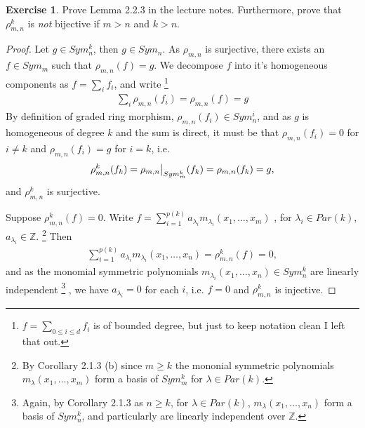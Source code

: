 \documentclass[12pt]{extarticle}
\newcommand{\Z}{\mathbb{Z}}
\newcommand{\<}{\langle}
\renewcommand{\>}{\rangle}
\theoremstyle{definition}
\newtheorem{exercise}{Exercise}
\newcommand\restr[2]{{%
  \left.\kern-\nulldelimiterspace %
  #1 %
  \vphantom{\big|} %
  \right|_{#2} %
  }}
\begin{document}
\begin{exercise}
  Prove Lemma 2.2.3 in the lecture notes. Furthermore, prove that $\rho_{m,n}^k$ is \emph{not} bijective if $m>n$ and $k>n$.
\end{exercise}
\begin{proof}
  Let $g \in Sym_n^k$, then $g \in Sym_n$. As $\rho_{m,n}$ is surjective, there exists an $f \in Sym_m$ such that $\rho_{m,n}(f) = g$. We decompose $f$ into it's homogeneous components as $f = \sum\limits_{i} f_i$, and write
  \footnote{$f = \sum\limits_{0 \leq i \leq d} f_i$ is of bounded degree, but just to keep notation clean I left that out.}
  \begin{align*}
    \sum\limits_i \rho_{m,n}(f_i) =  \rho_{m,n}(f) = g
  \end{align*}
  By definition of graded ring morphism, $\rho_{m,n}(f_i) \in Sym_n^i$, and as $g$ is homogeneous of degree $k$ and the sum is direct, it must be that $\rho_{m,n}(f_i) = 0$ for $i \neq k$ and $\rho_{m,n}(f_i) = g$ for $i=k$, i.e.
  \begin{align*}
    \rho_{m,n}^k(f_k) = \restr{\rho_{m,n}}{Sym_m^k}(f_k) = \rho_{m,n}(f_k) = g,
  \end{align*}
  and $\rho_{m,n}^k$ is surjective.

  Suppose $\rho_{m,n}^k(f) = 0$. Write $f = \sum\limits_{i=1}^{p(k)} a_{\lambda_i} m_{\lambda_i}(x_1, \dots, x_m)$
  , for $\lambda_i \in Par(k)$, $a_{\lambda_i} \in \Z$.
  \footnote{
  By Corollary 2.1.3 (b) since $m \geq k$ the mononial symmetric polynomials $m_{\lambda}(x_1, \dots, x_m)$ form a basis of $Sym_m^k$ for $\lambda \in Par(k)$.
  }
  Then
  \begin{align*}
   \sum\limits_{i=1}^{p(k)} a_{\lambda_i} m_{\lambda_i}(x_1, \dots, x_n) =  \rho_{m,n}^k(f) = 0,
  \end{align*}
  and as the monomial symmetric polynomials $m_{\lambda_i}(x_1, \dots, x_n) \in Sym_n^k$ are linearly independent
  \footnote{
  Again, by Corollary 2.1.3 as $n \geq k$, for $\lambda \in Par(k)$, $m_{\lambda}(x_1, \dots, x_n)$ form a basis of $Sym_n^k$, and particularly are linearly independent over $\Z$.
  }
  , we have $a_{\lambda_i}=0$ for each $i$, i.e. $f=0$ and $\rho_{m,n}^k$ is injective.
\end{proof}
\end{document}
